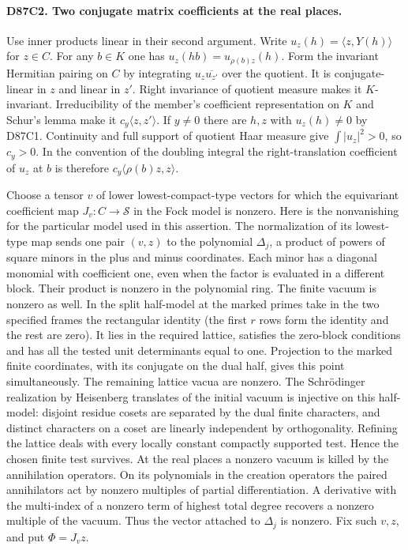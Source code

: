 \paragraph{D87C2. Two conjugate matrix coefficients at the real places.}
Use inner products linear in their second argument. Write
$u_z(h)=\langle z,Y(h)\rangle$ for $z\in C$. For any $b\in K$
one has $u_z(hb)=u_{\rho(b)z}(h)$. Form the invariant Hermitian
pairing on $C$ by integrating $u_z\overline{u_{z'}}$ over the
quotient. It is conjugate-linear in $z$ and linear in $z'$.
Right invariance of quotient measure makes it $K$-invariant.
Irreducibility of the member's coefficient representation on $K$
and Schur's lemma make it $c_y\langle z,z'\rangle$. If $y\ne0$
there are $h,z$ with $u_z(h)\ne0$ by D87C1. Continuity and
full support of quotient Haar measure give $\int |u_z|^2>0$,
so $c_y>0$. In the convention of the doubling integral the
right-translation coefficient of $u_z$ at $b$ is therefore
$c_y\langle\rho(b)z,z\rangle$.

Choose a tensor $v$ of lower lowest-compact-type vectors for which
the equivariant coefficient map $J_v:C\to\mathcal S$ in the Fock
model is nonzero. Here is the nonvanishing for the particular model
used in this assertion. The normalization of its lowest-type map
sends one pair $(v,z)$ to the polynomial $\Delta_j$, a product of
powers of square minors in the plus and minus coordinates. Each
minor has a diagonal monomial with coefficient one, even when the
factor is evaluated in a different block. Their product is nonzero
in the polynomial ring. The finite vacuum is nonzero as well. In
the split half-model at the marked primes take in the two specified
frames the rectangular identity (the first $r$ rows form the
identity and the rest are zero). It lies in the required lattice,
satisfies the zero-block conditions and has all the tested unit
determinants equal to one. Projection to the marked finite
coordinates, with its conjugate on the dual half, gives this point
simultaneously. The remaining lattice vacua are nonzero. The
Schr\"odinger realization by Heisenberg translates of the initial
vacuum is injective on this half-model: disjoint residue cosets are
separated by the dual finite characters, and distinct characters
on a coset are linearly independent by orthogonality. Refining the
lattice deals with every locally constant compactly supported test.
Hence the chosen finite test survives. At the real places a nonzero
vacuum is killed by the annihilation operators. On its polynomials
in the creation operators the paired annihilators act by nonzero
multiples of partial differentiation. A derivative with the
multi-index of a nonzero term of highest total degree recovers
a nonzero multiple of the vacuum. Thus the vector attached to
$\Delta_j$ is nonzero. Fix such $v,z$, and put $\Phi=J_vz$.

